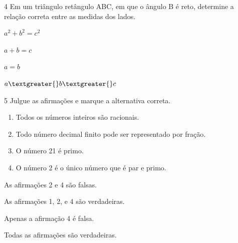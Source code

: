 
\pagebreak

\num{4} Em um triângulo retângulo ABC, em que o ângulo B é reto, determine a
relação correta entre as medidas dos lados.

\begin{escolha}
\item $a^2 + b^2 = c^2$
\item $a + b = c$
\item $a = b$
\item $a \textgreater{} b \textgreater{} c$
\end{escolha}






\num{5} Julgue as afirmações e marque a alternativa correta.

\begin{enumerate}
\item Todos os números inteiros são racionais.

\item Todo número decimal finito pode ser representado por fração.

\item O número 21 é primo.

\item O número 2 é o único número que é par e primo.
\end{enumerate}

\begin{escolha}
\item
  As afirmações 2 e 4 são falsas.
\item
  As afirmações 1, 2, e 4 são verdadeiras.
\item
  Apenas a afirmação 4 é falsa.
\item
  Todas as afirmações são verdadeiras.
\end{escolha}

